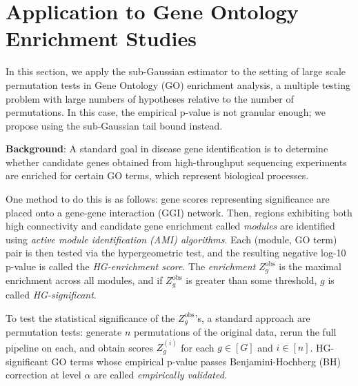 \documentclass{article}
\theoremstyle{definition}
\newcommand{\1}{\mathbbm{1}}
\begin{document}

\section{Application to Gene Ontology Enrichment Studies}
\label{sec:go-enrichment}
In this section, we apply the sub-Gaussian estimator to the setting of large scale permutation tests in Gene Ontology (GO) enrichment analysis, a multiple testing problem with large numbers of hypotheses relative to the number of permutations. In this case, the empirical p-value is not granular enough; we propose using the sub-Gaussian tail bound instead.

\noindent \textbf{Background}:
A standard goal in disease gene identification is to determine whether candidate genes obtained from high-throughput sequencing experiments are enriched for certain GO terms, which represent biological processes.

One method to do this \citep{levi2021domino, liu2025beyond} is as follows: gene scores representing significance are placed onto a gene-gene interaction (GGI) network. Then, regions exhibiting both high connectivity and candidate gene enrichment called \emph{modules} are identified using \emph{active module identification (AMI) algorithms}. Each (module, GO term) pair is then tested via the hypergeometric test, and the resulting negative log-10 p-value is called the \emph{HG-enrichment score}. The \emph{enrichment} $Z^{\text{obs}}_g$ is the maximal enrichment across all modules, and if $Z^{\text{obs}}_g$ is greater than some threshold, $g$ is called \emph{HG-significant}.

To test the statistical significance of the $Z^{\text{obs}}_g$'s, a standard approach are permutation tests: generate $n$ permutations of the original data, rerun the full pipeline on each, and obtain scores $Z^{(i)}_g$ for each $g \in [G]$ and $i \in [n]$. HG-significant GO terms whose empirical p-value passes Benjamini-Hochberg (BH) correction at level $\alpha$ are called \emph{empirically validated.}
\end{document}
